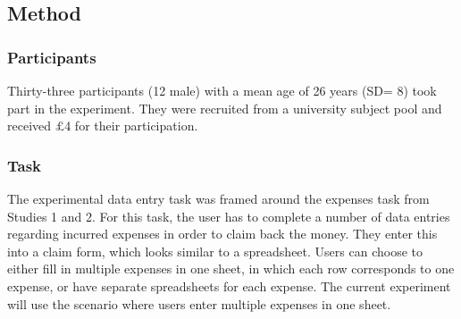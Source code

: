 \begin{table}
\begin{itemize}


 
\subsection{Method}
\subsubsection{Participants}
Thirty-three participants (12 male) with a mean age of 26 years (SD= 8) took part in the experiment. They were recruited from a university subject pool and received $\pounds$4 for their participation.

\subsubsection{Task}
The experimental data entry task was framed around the expenses task from Studies 1 and 2. For this task, the user has to complete a number of data entries regarding incurred expenses in order to claim back the money. They enter this into a claim form, which looks similar to a spreadsheet. Users can choose to either fill in multiple expenses in one sheet, in which each row corresponds to one expense, or have separate spreadsheets for each expense. The current experiment will use the scenario where users enter multiple expenses in one sheet.


\end{itemize}
\end{table}
